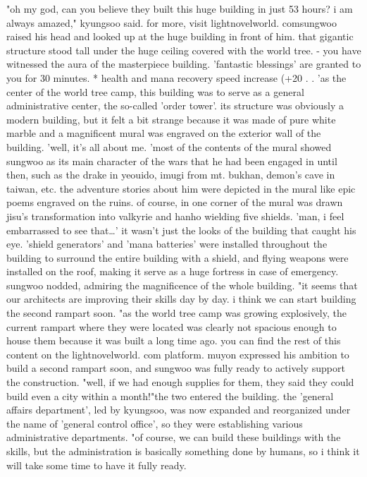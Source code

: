 "oh my god, can you believe they built this huge building in just 53 hours? i am always amazed," kyungsoo said.
 for more, visit lightnovelworld.
comsungwoo raised his head and looked up at the huge building in front of him.
 that gigantic structure stood tall under the huge ceiling covered with the world tree.
 - you have witnessed the aura of the masterpiece building.
 'fantastic blessings' are granted to you for 30 minutes.
* health and mana recovery speed increase (+20%
.
.
'as the center of the world tree camp, this building was to serve as a general administrative center, the so-called 'order tower'.
 its structure was obviously a modern building, but it felt a bit strange because it was made of pure white marble and a magnificent mural was engraved on the exterior wall of the building.
'well, it's all about me.
'most of the contents of the mural showed sungwoo as its main character of the wars that he had been engaged in until then, such as the drake in yeouido, imugi from mt.
 bukhan, demon's cave in taiwan, etc.
 the adventure stories about him were depicted in the mural like epic poems engraved on the ruins.
of course, in one corner of the mural was drawn jisu's transformation into valkyrie and hanho wielding five shields.
'man, i feel embarrassed to see that…'
it wasn't just the looks of the building that caught his eye.
 'shield generators' and 'mana batteries' were installed throughout the building to surround the entire building with a shield, and flying weapons were installed on the roof, making it serve as a huge fortress in case of emergency.
sungwoo nodded, admiring the magnificence of the whole building.
"it seems that our architects are improving their skills day by day.
 i think we can start building the second rampart soon.
"as the world tree camp was growing explosively, the current rampart where they were located was clearly not spacious enough to house them because it was built a long time ago.
you can find the rest of this content on the lightnov‌elworld.
com platform.
muyon expressed his ambition to build a second rampart soon, and sungwoo was fully ready to actively support the construction.
"well, if we had enough supplies for them, they said they could build even a city within a month!"the two entered the building.
the 'general affairs department', led by kyungsoo, was now expanded and reorganized under the name of 'general control office', so they were establishing various administrative departments.
"of course, we can build these buildings with the skills, but the administration is basically something done by humans, so i think it will take some time to have it fully ready.
